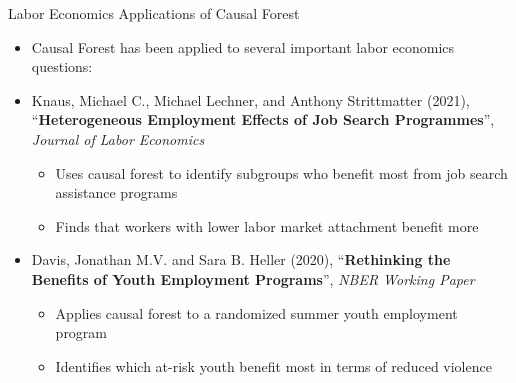 \documentclass[hyperref={pdfpagelabels=false}]{beamer}
\begin{document}
\begin{frame}{Labor Economics Applications of Causal Forest}
	\begin{itemize}
		\item Causal Forest has been applied to several important labor economics questions:
		\vspace{0.3cm}
		\item[] Knaus, Michael C., Michael Lechner, and Anthony Strittmatter (2021), ``\textbf{Heterogeneous Employment Effects of Job Search Programmes}'', \textit{Journal of Labor Economics}
		\vspace{0.2cm}
		\begin{itemize}
			\item Uses causal forest to identify subgroups who benefit most from job search assistance programs
			\vspace{0.2cm}
			\item Finds that workers with lower labor market attachment benefit more
		\end{itemize}
		\vspace{0.3cm}
		\item[] Davis, Jonathan M.V. and Sara B. Heller (2020), ``\textbf{Rethinking the Benefits of Youth Employment Programs}'', \textit{NBER Working Paper}
		\vspace{0.2cm}
		\begin{itemize}
			\item Applies causal forest to a randomized summer youth employment program
			\vspace{0.2cm}
			\item Identifies which at-risk youth benefit most in terms of reduced violence
		\end{itemize}
	\end{itemize}
\end{frame}
\end{document}
